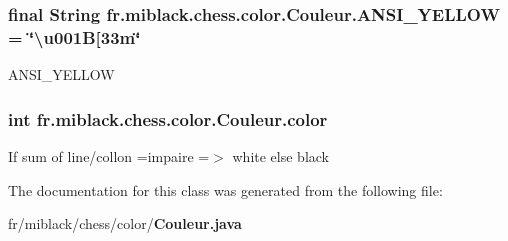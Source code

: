 \subsubsection[{A\-N\-S\-I\-\_\-\-Y\-E\-L\-L\-O\-W}]{\setlength{\rightskip}{0pt plus 5cm}final String fr.\-miblack.\-chess.\-color.\-Couleur.\-A\-N\-S\-I\-\_\-\-Y\-E\-L\-L\-O\-W = \char`\"{}\textbackslash{}u001\-B[33m\char`\"{}\hspace{0.3cm}{\ttfamily [static]}}\label{classfr_1_1miblack_1_1chess_1_1color_1_1Couleur_abfe59a6c2f5798e2959272ba53212418}
A\-N\-S\-I\-\_\-\-Y\-E\-L\-L\-O\-W 
\subsubsection[{color}]{\setlength{\rightskip}{0pt plus 5cm}int fr.\-miblack.\-chess.\-color.\-Couleur.\-color\hspace{0.3cm}{\ttfamily [protected]}}\label{classfr_1_1miblack_1_1chess_1_1color_1_1Couleur_a51a8fdcfa76057d53b06385515363020}
If sum of line/collon =impaire =$>$ white else black 

The documentation for this class was generated from the following file\-:\begin{DoxyCompactItemize}
\item 
fr/miblack/chess/color/{\bf Couleur.\-java}\end{DoxyCompactItemize}
